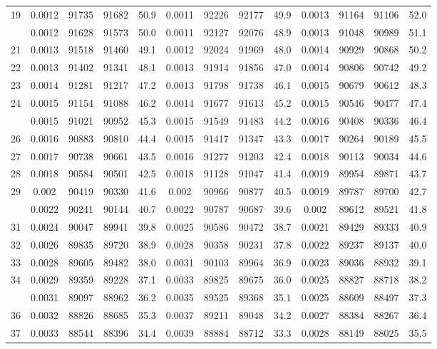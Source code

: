 \documentclass[
  14pt,
]{article}
\begin{document}
\begin{longtable}[t]{lcccccccccccc}
19 & 0.0012 & 91735 & 91682 & 50.9 & 0.0011 & 92226 & 92177 & 49.9 & 0.0013 & 91164 & 91106 & 52.0\\
\addlinespace
20 & 0.0012 & 91628 & 91573 & 50.0 & 0.0011 & 92127 & 92076 & 48.9 & 0.0013 & 91048 & 90989 & 51.1\\
21 & 0.0013 & 91518 & 91460 & 49.1 & 0.0012 & 92024 & 91969 & 48.0 & 0.0014 & 90929 & 90868 & 50.2\\
22 & 0.0013 & 91402 & 91341 & 48.1 & 0.0013 & 91914 & 91856 & 47.0 & 0.0014 & 90806 & 90742 & 49.2\\
23 & 0.0014 & 91281 & 91217 & 47.2 & 0.0013 & 91798 & 91738 & 46.1 & 0.0015 & 90679 & 90612 & 48.3\\
24 & 0.0015 & 91154 & 91088 & 46.2 & 0.0014 & 91677 & 91613 & 45.2 & 0.0015 & 90546 & 90477 & 47.4\\
\addlinespace
25 & 0.0015 & 91021 & 90952 & 45.3 & 0.0015 & 91549 & 91483 & 44.2 & 0.0016 & 90408 & 90336 & 46.4\\
26 & 0.0016 & 90883 & 90810 & 44.4 & 0.0015 & 91417 & 91347 & 43.3 & 0.0017 & 90264 & 90189 & 45.5\\
27 & 0.0017 & 90738 & 90661 & 43.5 & 0.0016 & 91277 & 91203 & 42.4 & 0.0018 & 90113 & 90034 & 44.6\\
28 & 0.0018 & 90584 & 90501 & 42.5 & 0.0018 & 91128 & 91047 & 41.4 & 0.0019 & 89954 & 89871 & 43.7\\
29 & 0.002 & 90419 & 90330 & 41.6 & 0.002 & 90966 & 90877 & 40.5 & 0.0019 & 89787 & 89700 & 42.7\\
\addlinespace
30 & 0.0022 & 90241 & 90144 & 40.7 & 0.0022 & 90787 & 90687 & 39.6 & 0.002 & 89612 & 89521 & 41.8\\
31 & 0.0024 & 90047 & 89941 & 39.8 & 0.0025 & 90586 & 90472 & 38.7 & 0.0021 & 89429 & 89333 & 40.9\\
32 & 0.0026 & 89835 & 89720 & 38.9 & 0.0028 & 90358 & 90231 & 37.8 & 0.0022 & 89237 & 89137 & 40.0\\
33 & 0.0028 & 89605 & 89482 & 38.0 & 0.0031 & 90103 & 89964 & 36.9 & 0.0023 & 89036 & 88932 & 39.1\\
34 & 0.0029 & 89359 & 89228 & 37.1 & 0.0033 & 89825 & 89675 & 36.0 & 0.0025 & 88827 & 88718 & 38.2\\
\addlinespace
35 & 0.0031 & 89097 & 88962 & 36.2 & 0.0035 & 89525 & 89368 & 35.1 & 0.0025 & 88609 & 88497 & 37.3\\
36 & 0.0032 & 88826 & 88685 & 35.3 & 0.0037 & 89211 & 89048 & 34.2 & 0.0027 & 88384 & 88267 & 36.4\\
37 & 0.0033 & 88544 & 88396 & 34.4 & 0.0039 & 88884 & 88712 & 33.3 & 0.0028 & 88149 & 88025 & 35.5\\

\end{longtable}
\end{document}
